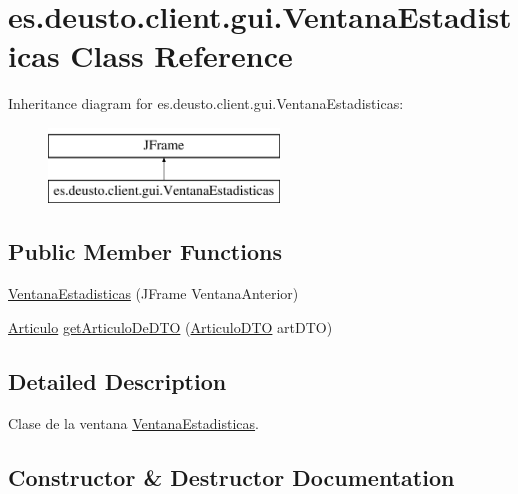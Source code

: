 \hypertarget{classes_1_1deusto_1_1client_1_1gui_1_1_ventana_estadisticas}{}\section{es.\+deusto.\+client.\+gui.\+Ventana\+Estadisticas Class Reference}
\label{classes_1_1deusto_1_1client_1_1gui_1_1_ventana_estadisticas}
Inheritance diagram for es.\+deusto.\+client.\+gui.\+Ventana\+Estadisticas\+:\begin{figure}[H]
\begin{center}
\leavevmode
\includegraphics[height=2.000000cm]{classes_1_1deusto_1_1client_1_1gui_1_1_ventana_estadisticas}
\end{center}
\end{figure}
\subsection*{Public Member Functions}
\begin{DoxyCompactItemize}
\item 
\mbox{\hyperlink{classes_1_1deusto_1_1client_1_1gui_1_1_ventana_estadisticas_aea94dd496636331fe4e5c507fc86e9f8}{Ventana\+Estadisticas}} (J\+Frame Ventana\+Anterior)
\item 
\mbox{\hyperlink{classes_1_1deusto_1_1client_1_1data_1_1_articulo}{Articulo}} \mbox{\hyperlink{classes_1_1deusto_1_1client_1_1gui_1_1_ventana_estadisticas_a5b9c9a6b32f98ebd348e429ee8a2b54c}{get\+Articulo\+De\+D\+TO}} (\mbox{\hyperlink{classes_1_1deusto_1_1server_1_1dto_1_1_articulo_d_t_o}{Articulo\+D\+TO}} art\+D\+TO)
\end{DoxyCompactItemize}


\subsection{Detailed Description}
Clase de la ventana \mbox{\hyperlink{classes_1_1deusto_1_1client_1_1gui_1_1_ventana_estadisticas}{Ventana\+Estadisticas}}. 

\subsection{Constructor \& Destructor Documentation}
\mbox{\label{classes_1_1deusto_1_1client_1_1gui_1_1_ventana_estadisticas_aea94dd496636331fe4e5c507fc86e9f8}} 
